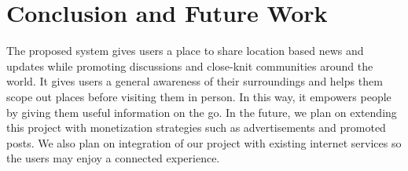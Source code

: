 \chapter{Conclusion and Future Work}
The proposed system gives users a place to share location based news and updates while promoting discussions and close-knit communities around the world. It gives users a general awareness of their surroundings and helps them scope out places before visiting them in person. In this way, it empowers people by giving them useful information on the go.
In the future, we plan on extending this project with monetization strategies such as advertisements and promoted posts. We also plan on integration of our project with existing internet services so the users may enjoy a connected experience.  


